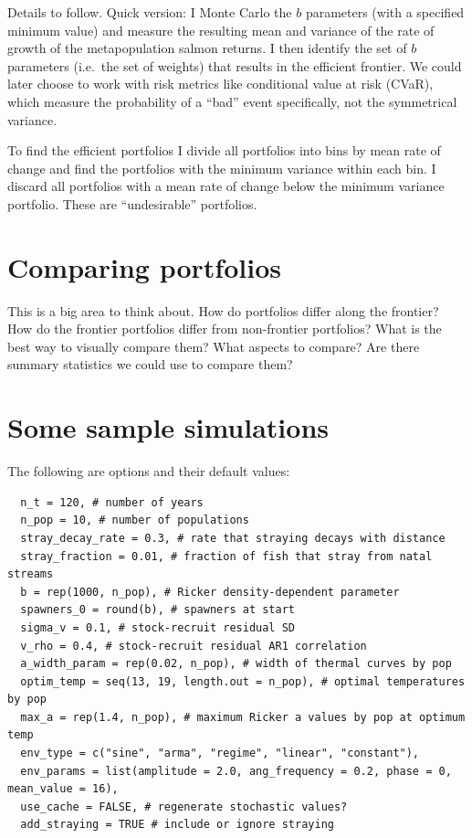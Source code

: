 \documentclass[12pt]{article}
\begin{document}
Details to follow. Quick version: I Monte Carlo the $b$ parameters (with
a specified minimum value) and measure the resulting mean and variance
of the rate of growth of the metapopulation salmon returns. I then
identify the set of $b$ parameters (i.e.~the set of weights) that
results in the efficient frontier. We could later choose to work with
risk metrics like conditional value at risk (CVaR), which measure the
probability of a ``bad'' event specifically, not the symmetrical
variance.

To find the efficient portfolios I divide all portfolios into bins by
mean rate of change and find the portfolios with the minimum variance
within each bin. I discard all portfolios with a mean rate of change
below the minimum variance portfolio. These are ``undesirable''
portfolios.

\section{Comparing portfolios}

This is a big area to think about. How do portfolios differ along the
frontier? How do the frontier portfolios differ from non-frontier
portfolios? What is the best way to visually compare them? What aspects
to compare? Are there summary statistics we could use to compare them?

\section{Some sample simulations}

The following are options and their default values:

\begin{verbatim}
  n_t = 120, # number of years
  n_pop = 10, # number of populations
  stray_decay_rate = 0.3, # rate that straying decays with distance
  stray_fraction = 0.01, # fraction of fish that stray from natal streams
  b = rep(1000, n_pop), # Ricker density-dependent parameter
  spawners_0 = round(b), # spawners at start
  sigma_v = 0.1, # stock-recruit residual SD
  v_rho = 0.4, # stock-recruit residual AR1 correlation
  a_width_param = rep(0.02, n_pop), # width of thermal curves by pop
  optim_temp = seq(13, 19, length.out = n_pop), # optimal temperatures by pop
  max_a = rep(1.4, n_pop), # maximum Ricker a values by pop at optimum temp
  env_type = c("sine", "arma", "regime", "linear", "constant"),
  env_params = list(amplitude = 2.0, ang_frequency = 0.2, phase = 0, mean_value = 16),
  use_cache = FALSE, # regenerate stochastic values? 
  add_straying = TRUE # include or ignore straying
\end{verbatim}
\end{document}
